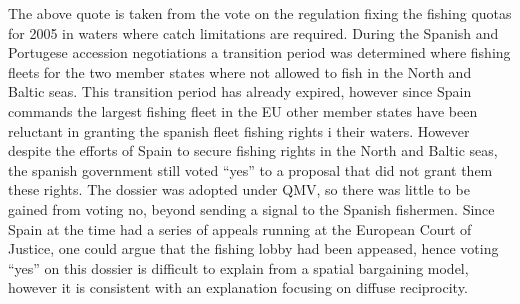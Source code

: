 The above quote is taken from the vote on the regulation fixing the fishing quotas for 2005 in waters where catch limitations are required.  During the Spanish and Portugese accession negotiations a transition period was determined where fishing fleets for the two member states where not allowed to fish in the North and Baltic seas. This transition period has already expired, however since Spain commands the largest fishing fleet in the EU other member states have been reluctant in granting the spanish fleet fishing rights i their waters. However despite the efforts of Spain to secure fishing rights in the North and Baltic seas, the spanish government still voted ``yes'' to a proposal that did not grant them these rights. The dossier was adopted under QMV, so there was little to be gained from voting no, beyond sending a signal to the Spanish fishermen. Since Spain at the time had a series of appeals running at the European Court of Justice, one could argue that the fishing lobby had been appeased, hence voting ``yes'' on this dossier is difficult to explain from a spatial bargaining model, however it  is consistent with an explanation focusing on diffuse reciprocity. 

